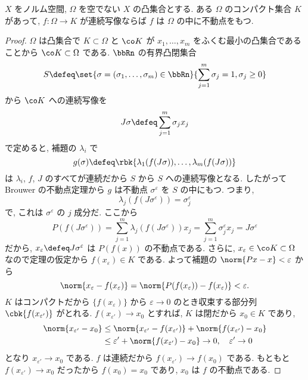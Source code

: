 \documentclass[openany, a4paper, oneside]{jsbook}
\begin{document}
\begin{thm}
 $X$ をノルム空間, $\Omega$ を空でない $X$ の凸集合とする.
 ある $\Omega$ のコンパクト集合 $K$ があって,  $f \colon \Omega \to K$ が連続写像ならば $f$ は $\Omega$ の中に不動点をもつ.
\end{thm}
\begin{proof}
$\Omega$ は凸集合で $K \subset \Omega$ と $\co K$ が $x_1, \dots , x_m$
をふくむ最小の凸集合であることから $\co K \subset \Omega$ である.
$\bbRn$ の有界凸閉集合
\begin{align}
 S
 \defeq
 \set{\sigma = (\sigma_1, \dots , \sigma_m) \in \bbRn}{\sum_{j=1}^m \sigma_j = 1, \sigma_j \ge 0}
\end{align}
から $\co K$ への連続写像を
\begin{equation}
 J \sigma
 \defeq
 \sum_{j=1}^m \sigma_j x_j
\end{equation}
で定めると, 補題の $\lambda_i$ で
\begin{equation}
 g (\sigma)
 \defeq
 \rbk{\lambda_1 (f (J\sigma)), \dots , \lambda_m (f (J\sigma))}
\end{equation}
は $\lambda_i$, $f$,  $J$ のすべてが連続だから $S$ から $S$ への連続写像となる.
したがって Brouwer の不動点定理から $g$ は不動点 $\sigma^\varepsilon$ を $S$ の中にもつ.
つまり,
\begin{equation}
 \lambda_j (f (J\sigma^\varepsilon))
 =
 \sigma_j^\varepsilon
\end{equation}
で, これは $\sigma^\varepsilon$ の $j$ 成分だ.
ここから
\begin{equation}
 P (f (J\sigma^{\varepsilon}))
 =
 \sum_{j=1}^m \lambda_j (f (J\sigma^{\varepsilon})) x_j
 =
 \sum_{j=1}^m \sigma_j^{\varepsilon} x_j
 =
 J\sigma^{\varepsilon}
\end{equation}
だから, $x_\varepsilon \defeq J \sigma^\varepsilon$ は $P(f(x))$ の不動点である.
さらに, $x_\varepsilon \in \co K \subset \Omega$ なので定理の仮定から
$f (x_\varepsilon) \in K$ である.
よって補題の $\norm{Px - x} < \varepsilon$ から
\begin{equation}
 \norm{x_{\varepsilon} - f (x_{\varepsilon})}
 =
 \norm{P (f (x_\varepsilon)) - f (x_\varepsilon)}
 <
 \varepsilon.
\end{equation}
$K$ はコンパクトだから $\{f (x_\varepsilon)\}$ から $\varepsilon \to 0$ のとき収束する部分列
$\cbk{f (x_{\varepsilon'})}$ がとれる.
$f (x_{\varepsilon'}) \to x_0$ とすれば, $K$ は閉だから $x_0 \in K$ であり,
\begin{align}
 \norm{x_{\varepsilon'} - x_0}
 &\le
 \norm{x_{\varepsilon'} - f (x_{\varepsilon'})}
  +\norm{f (x_{\varepsilon'}) - x_0}   \\
 &\le
 \varepsilon' + \norm{f(x_{\varepsilon'}) - x_0}
 \to 0, \quad \varepsilon' \to 0
\end{align}
となり $x_{\varepsilon'} \to x_0$ である.
$f$ は連続だから $f (x_{\varepsilon'}) \to f (x_0)$ である.
もともと $f (x_{\varepsilon'}) \to x_0$ だったから $f (x_0) = x_0$ であり, $x_0$ は $f$ の不動点である.
\end{proof}
\end{document}
